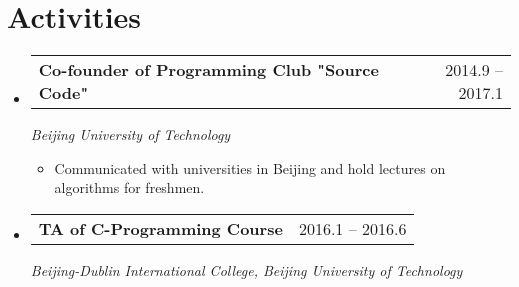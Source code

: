 \documentclass[a4paper,11pt]{article}
\makeatletter
\newcommand{\resumeItem}[1]{
  \item\small{#1 \vspace{-2pt}}
}
\newcommand{\resumeSubheading}[3]{
  \vspace{-1pt}\item
    \begin{tabular*}{0.97\textwidth}{l@{\extracolsep{\fill}}r}
      \textbf{#1} & #2
      \end{tabular*}
      \textit{\small#3}
}
\newcommand{\resumeItemListStart}{\begin{itemize}[leftmargin=*, topsep=0ex]}
\newcommand{\resumeItemListEnd}{\end{itemize}}
\makeatother
\begin{document}
\section{Activities}
  \begin{itemize}[leftmargin=*, itemsep=-1pt, label={}]
    \resumeSubheading{Co-founder of Programming Club "Source Code"}{2014.9 -- 2017.1}{Beijing University of Technology}
      \resumeItemListStart
        \resumeItem {Communicated with universities in Beijing and hold lectures on algorithms for freshmen.}
      \resumeItemListEnd
    \resumeSubheading{TA of C-Programming Course}{2016.1 -- 2016.6}{Beijing-Dublin International College, Beijing University of Technology}
  \end{itemize}



\end{document}
